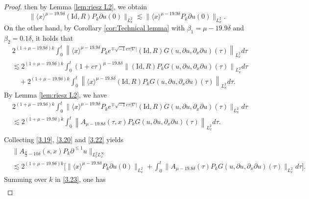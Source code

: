 \documentclass[11pt,twoside]{article}
\def\f{\frac}
\def\p{\partial}
\def\ls{\lesssim}
\newcommand{\w}[1]{\langle {#1} \rangle}
\theoremstyle{plain}
\theoremstyle{definition}
\numberwithin{equation}{section}
\begin{document}
\begin{proof}
 then by Lemma \ref{lem:riesz L2}, we obtain
	\begin{equation}\label{3.20}
	\|\w{x}^{\mu-19.9\delta}(\mathrm{Id},R)P_k\partial u(0)\|_{L^2_x}
	\ls
	\|\w{x}^{\mu-19.9\delta}P_k\partial u(0)\|_{L^2_x}.
	\end{equation}
On the other hand, by Corollary \ref{cor:Technical lemma} with $\beta_1 =\mu-19.9\delta$ and $\beta_2 = 0.1\delta$,
it holds that
\begin{equation*}
\begin{split}
&2^{(1+\mu-19.9\delta) k}
\int_{0}^{t}\left\|\w{x}^{\mu-19.9\delta}P_ke^{\mp \sqrt{-1}c\tau|\nabla|} (\mathrm{Id},R) G(u,\p u,\p_x\p u)(\tau)\right\|_{L^2_x}d\tau\\
&\ls 2^{(1+\mu-19.9\delta) k}
\int_{0}^{t}(1+c\tau)^{\mu-19.8\delta}\left\|(\mathrm{Id},R)
P_k G(u,\p u,\p_x\p u)(\tau)\right\|_{L^2_x}d\tau\\
&\quad+2^{(1+\mu-19.9\delta) k}
\int_{0}^{t}\left\|\w{x}^{\mu-19.8\delta}(\mathrm{Id},R)
P_k G(u,\p u,\p_x\p u)(\tau)\right\|_{L^2_x}d\tau.
\end{split}
\end{equation*}
	By Lemma \ref{lem:riesz L2}, we have
	\begin{equation}\label{3.22}
	\begin{split}
	&2^{(1+\mu-19.9\delta) k}
	\int_{0}^{t}\big\|\w{x}^{\mu-19.9\delta}P_ke^{\mp \sqrt{-1}c\tau|\nabla|} (\mathrm{Id},R) G(u,\p u,\p_x\p u)(\tau)\big\|_{L^2_x}d\tau\\
	&\ls
	2^{(1+\mu-19.9\delta) k}
	\int_{0}^{t}\left\|A_{\mu-19.8\delta}(\tau,x)
	P_k G(u,\p u,\p_x\p u)(\tau)\right\|_{L^2_x}d\tau.\\
	\end{split}
	\end{equation}
	Collecting \eqref{3.19}, \eqref{3.20} and \eqref{3.22} yields
	\begin{equation}\label{3.23}
		\begin{split}
			&\|A_{\f{\mu}{2}-10\delta}(s,x)P_k\p^{\le 1} u\|_{L^{2}_tL^\infty_x}\\
			&\ls2^{(1+\mu-19.9\delta) k}
			\big[\|\w{x}^{\mu-19.8\delta}P_k\partial u(0)\|_{L^2_x}
			+\int_{0}^{t}\big\|A_{\mu-19.8\delta}(\tau)P_k  G(u,\p u,\p_x\p u)(\tau)\big\|_{L^{2}_x}d\tau
			\big].
		\end{split}
	\end{equation}
	Summing over $k$ in \eqref{3.23}, one has
	\begin{equation}\label{YHCCC-101}
	\begin{split}

\end{split}
\end{equation}
\end{proof}
\end{document}

